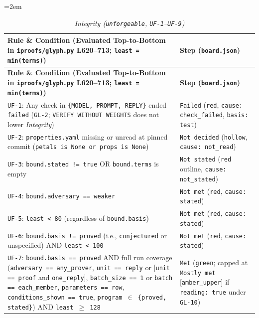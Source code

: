\documentclass[11pt,letterpaper]{article}
\begin{document}
{\footnotesize\setlength{\tabcolsep}{4pt}\emergencystretch=2em
\begin{longtable}{@{}>{\raggedright\arraybackslash}p{} >{\raggedright\arraybackslash}p{}@{}}
\caption{\textit{Integrity (\texttt{unforgeable}, \texttt{UF-1}--\texttt{UF-9})}} \\
\toprule
\textbf{Rule \& Condition (Evaluated Top-to-Bottom in \texttt{iproofs/\allowbreak{}glyph.\allowbreak{}py} L620--713; \texttt{least = min(terms)})} & \textbf{Step (\texttt{board.\allowbreak{}json})} \\
\midrule
\endfirsthead
\toprule
\textbf{Rule \& Condition (Evaluated Top-to-Bottom in \texttt{iproofs/\allowbreak{}glyph.\allowbreak{}py} L620--713; \texttt{least = min(terms)})} & \textbf{Step (\texttt{board.\allowbreak{}json})} \\
\midrule
\endhead
\bottomrule
\endfoot
\texttt{UF-1}: Any check in \texttt{\{MODEL, PROMPT, REPLY\}} ended \texttt{failed} (\texttt{GL-2}; \texttt{VERIFY WITHOUT WEIGHTS} does not lower \textit{Integrity}) & \texttt{Failed} (\texttt{red}, \texttt{cause: check\_\allowbreak{}failed}, \texttt{basis: test}) \\
\texttt{UF-2}: \texttt{properties.\allowbreak{}yaml} missing or unread at pinned commit (\texttt{petals is None or props is None}) & \texttt{Not decided} (\texttt{hollow}, \texttt{cause: not\_\allowbreak{}read}) \\
\texttt{UF-3}: \texttt{bound.\allowbreak{}stated != true} OR \texttt{bound.\allowbreak{}terms} is empty & \texttt{Not stated} (\texttt{red} outline, \texttt{cause: not\_\allowbreak{}stated}) \\
\texttt{UF-4}: \texttt{bound.\allowbreak{}adversary == weaker} & \texttt{Not met} (\texttt{red}, \texttt{cause: stated}) \\
\texttt{UF-5}: \texttt{least < 80} (regardless of \texttt{bound.\allowbreak{}basis}) & \texttt{Not met} (\texttt{red}, \texttt{cause: stated}) \\
\texttt{UF-6}: \texttt{bound.\allowbreak{}basis != proved} (i.e., \texttt{conjectured} or unspecified) AND \texttt{least < 100} & \texttt{Not met} (\texttt{red}, \texttt{cause: stated}) \\
\texttt{UF-7}: \texttt{bound.\allowbreak{}basis == proved} AND full run coverage (\texttt{adversary == any\_\allowbreak{}prover}, \texttt{unit == reply} or [\texttt{unit == proof} and \texttt{one\_\allowbreak{}reply}], \texttt{batch\_\allowbreak{}size == 1} or \texttt{batch == each\_\allowbreak{}member}, \texttt{parameters == row}, \texttt{conditions\_\allowbreak{}shown == true}, \texttt{program $\in$ \{proved, stated\}}) AND \texttt{least $\ge$ 128} & \texttt{Met} (\texttt{green}; capped at \texttt{Mostly met} [\texttt{amber\_\allowbreak{}upper}] if \texttt{reading: true} under \texttt{GL-10}) \\

\end{longtable}}
\end{document}
